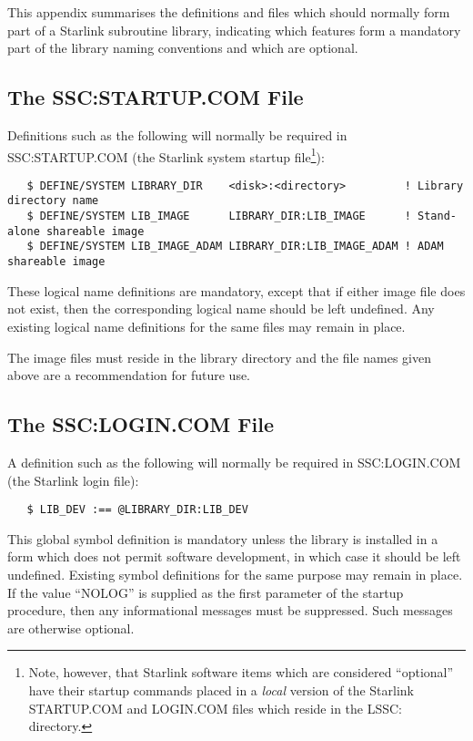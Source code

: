 This appendix summarises the definitions and files which should normally
form part of a Starlink subroutine library, indicating which features form a
mandatory part of the library naming conventions and which are optional. 

\subsection{The SSC:STARTUP.COM File}

Definitions such as the following will normally be required in
SSC:STARTUP.COM (the Starlink system startup 
file\footnote{Note, however, that Starlink software items which are
considered ``optional'' have their startup commands placed in a {\em
local\/} version of the Starlink STARTUP.COM and LOGIN.COM files which
reside in the LSSC: directory.}): 

\begin{verbatim}
   $ DEFINE/SYSTEM LIBRARY_DIR    <disk>:<directory>         ! Library directory name
   $ DEFINE/SYSTEM LIB_IMAGE      LIBRARY_DIR:LIB_IMAGE      ! Stand-alone shareable image
   $ DEFINE/SYSTEM LIB_IMAGE_ADAM LIBRARY_DIR:LIB_IMAGE_ADAM ! ADAM shareable image
\end{verbatim}

These logical name definitions are mandatory, except that if either image
file does not exist, then the corresponding logical name should be left
undefined. 
Any existing logical name definitions for the same files may remain in place.

The image files must reside in the library directory and the file names
given above are a recommendation for future use. 

\subsection{The SSC:LOGIN.COM File}

A definition such as the following will normally be required in
SSC:LOGIN.COM (the Starlink login file\footnotemark[\thefootnote]):

\begin{verbatim}
   $ LIB_DEV :== @LIBRARY_DIR:LIB_DEV
\end{verbatim}

This global symbol definition is mandatory unless the library is installed
in a form which does not permit software development, in which case it
should be left undefined. 
Existing symbol definitions for the same purpose may remain in place.
If the value ``NOLOG'' is supplied as the first parameter of the startup 
procedure, then any informational messages must be suppressed.
Such messages are otherwise optional.

